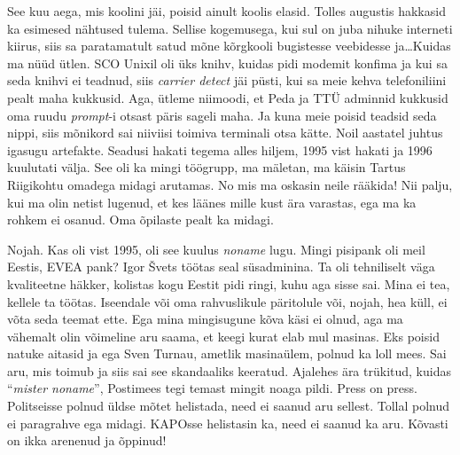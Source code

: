 See kuu aega, mis koolini jäi, poisid ainult koolis elasid. Tolles augustis hakkasid ka esimesed nähtused tulema. Sellise kogemusega, kui sul on juba nihuke interneti kiirus,  siis sa paratamatult satud mõne kõrgkooli bugistesse veebidesse ja\ldots Kuidas ma nüüd ütlen. SCO Unixil oli üks knihv, kuidas  pidi modemit konfima ja kui sa seda knihvi ei teadnud, siis \emph{carrier detect} jäi püsti, kui sa meie kehva telefoniliini pealt maha kukkusid. Aga, ütleme niimoodi, et  Peda ja TTÜ adminnid kukkusid oma ruudu \emph{prompt}-i otsast päris sageli maha. Ja kuna meie poisid teadsid seda nippi, siis mõnikord sai niiviisi toimiva terminali otsa kätte. Noil aastatel juhtus igasugu artefakte. Seadusi hakati tegema alles hiljem, 1995 vist hakati ja 1996 kuulutati välja. See oli ka mingi töögrupp, ma mäletan, ma käisin Tartus Riigikohtu omadega midagi arutamas. No mis ma oskasin neile rääkida! Nii palju, kui ma olin netist lugenud, et kes läänes mille kust ära varastas, ega ma ka rohkem ei osanud. Oma õpilaste pealt ka midagi. 


Nojah. Kas oli vist 1995, oli see kuulus \emph{noname} lugu. Mingi pisipank oli meil Eestis, EVEA pank? Igor Švets töötas seal süsadminina. Ta oli tehniliselt väga kvaliteetne häkker, kolistas kogu Eestit pidi ringi, kuhu aga sisse sai. Mina ei tea, kellele ta töötas. Iseendale või oma rahvuslikule päritolule või, nojah, hea küll, ei võta seda teemat ette. Ega mina mingisugune kõva käsi ei olnud, aga ma vähemalt olin võimeline aru saama, et keegi kurat elab mul masinas. Eks poisid natuke aitasid ja ega Sven Turnau, ametlik masinaülem, polnud ka loll mees. Sai aru, mis toimub ja siis sai see skandaaliks keeratud. Ajalehes ära trükitud, kuidas \enquote{\emph{mister noname}},  Postimees tegi temast mingit noaga pildi. Press on press. Politseisse polnud üldse mõtet helistada, need ei saanud aru sellest. Tollal polnud ei paragrahve ega midagi. KAPOsse helistasin ka, need ei saanud ka aru. Kõvasti on ikka arenenud ja õppinud! 

